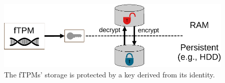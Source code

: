 \begin{figure}[htpb]
  \centering
  \includegraphics[width=0.8\linewidth]{figures/storage-encryption.pdf}
  \caption{The fTPMs' storage is protected by a key derived from its identity.}\label{fig:storage-encryption}
\end{figure}
